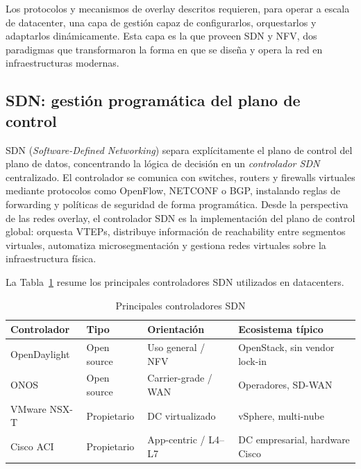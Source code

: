 
Los protocolos y mecanismos de overlay descritos requieren, para operar a escala de datacenter, una capa de gestión capaz de configurarlos, orquestarlos y adaptarlos dinámicamente. Esta capa es la que proveen SDN y NFV, dos paradigmas que transformaron la forma en que se diseña y opera la red en infraestructuras modernas.


\subsection{SDN: gestión programática del plano de control}

SDN (\textit{Software-Defined Networking}) separa explícitamente el plano de control del plano de datos, concentrando la lógica de decisión en un \textit{controlador SDN} centralizado. El controlador se comunica con switches, routers y firewalls virtuales mediante protocolos como OpenFlow, NETCONF o BGP, instalando reglas de forwarding y políticas de seguridad de forma programática. Desde la perspectiva de las redes overlay, el controlador SDN es la implementación del plano de control global: orquesta VTEPs, distribuye información de reachability entre segmentos virtuales, automatiza microsegmentación y gestiona redes virtuales sobre la infraestructura física.

La Tabla~\ref{tab:controladores} resume los principales controladores SDN utilizados en datacenters.

\begin{table}[H]
\centering
\caption{Principales controladores SDN}
\label{tab:controladores}
\begin{tabular}{llll}
\toprule
\textbf{Controlador} & \textbf{Tipo} & \textbf{Orientación} & \textbf{Ecosistema típico} \\
\midrule
OpenDaylight & Open source & Uso general / NFV      & OpenStack, sin vendor lock-in \\
ONOS         & Open source & Carrier-grade / WAN    & Operadores, SD-WAN            \\
VMware NSX-T & Propietario & DC virtualizado        & vSphere, multi-nube           \\
Cisco ACI    & Propietario & App-centric / L4--L7   & DC empresarial, hardware Cisco \\
\bottomrule
\end{tabular}
\end{table}


